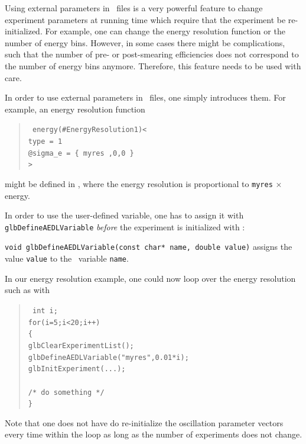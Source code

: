 Using external parameters in \AEDL\ files is a very powerful feature
to change experiment parameters at running time which require that
the experiment be re-initialized. For example, one can change the
energy resolution function or the number of energy bins. However,
in some cases there might be complications, such that the number
of pre- or post-smearing efficiencies does not correspond to the number
of energy bins anymore. Therefore, this feature needs to be 
used with care.

In order to use external parameters in \AEDL\ files, one simply
introduces them. For example, an energy resolution function
\begin{quote}
{\tt
energy(\#EnergyResolution1)< \\
\hspace*{1cm} type = 1 \\
\hspace*{1cm} @sigma\_e = \{ myres ,0,0 \} \\
> \\
}
\end{quote}
might be defined in \AEDL , where the energy resolution is proportional
to {\tt myres} $\times$ energy. 

In order to use the user-defined variable, one has to assign it 
with {\tt glbDefineAEDLVariable} {\em before} the experiment is initialized with :
\begin{function}
{\tt void glbDefineAEDLVariable(const char* name, double value)}
assigns the value {\tt value} to the \AEDL\ variable {\tt name}.
\end{function}
In our energy resolution example, one could now loop over the
energy resolution such as with
\begin{quote}
{\tt
int i; \\
for(i=5;i<20;i++) \\
\{ \\    
\hspace*{1cm} glbClearExperimentList(); \\
\hspace*{1cm} glbDefineAEDLVariable("myres",0.01*i); \\
\hspace*{1cm} glbInitExperiment(...); \\
\\
\hspace*{1cm} /* do something */ \\
\}
}
\end{quote}
Note that one does not have do re-initialize the oscillation
parameter vectors every time within the loop as long as the
number of experiments does not change.

